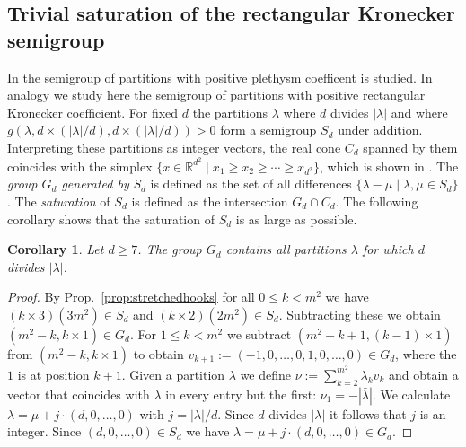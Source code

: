 \documentclass{article}
\numberwithin{equation}{section}
\newtheorem{corollary}[equation]{Corollary}
\theoremstyle{definition}
\def\la{\lambda}
\newcommand{\IR}{\mathbb R}
\begin{document}
\subsection{Trivial saturation of the rectangular Kronecker semigroup}
In \cite{BHI:15} the semigroup of partitions with positive plethysm coefficent is studied.
In analogy we study here the semigroup of partitions with positive rectangular Kronecker coefficient.
For fixed $d$ the partitions $\la$ where $d$ divides $|\la|$ and where $g(\la,d \times (|\la|/d), d \times (|\la|/d))>0$
form a semigroup $S_d$ under addition.
Interpreting these partitions as integer vectors, the real cone $C_d$ spanned by them
coincides with the simplex $\{x \in \IR^{d^2} \mid x_1 \geq x_2 \geq \cdots \geq x_{d^2}\}$,
which is shown in \cite{bci:09}.
The \emph{group $G_d$ generated by} $S_d$ is defined as the set of all differences $\{\la-\mu \mid \la,\mu\in S_d\}$.
The \emph{saturation} of $S_d$ is defined as the intersection $G_d \cap C_d$.
The following corollary shows that the saturation of $S_d$ is as large as possible.
\begin{corollary}\label{cor:kronsaturation}
Let $d \geq 7$. The group $G_d$ contains all partitions $\la$ for which $d$ divides $|\la|$.
\end{corollary}
\begin{proof}
By Prop.~\ref{prop:stretchedhooks} for all $0 \leq k < m^2$ we have $(k \times 3)(3m^2) \in S_d$ and $(k \times 2)(2m^2) \in S_d$.
Subtracting these we obtain $(m^2-k,k \times 1) \in G_d$.
For $1 \leq k < m^2$ we subtract $(m^2-k+1,(k-1) \times 1)$ from $(m^2-k,k \times 1)$ to obtain $v_{k+1}:=(-1,0,\ldots,0,1,0,\ldots,0) \in G_d$,
where the $1$ is at position $k+1$.
Given a partition $\la$ we define $\nu:=\sum_{k=2}^{m^2}\la_k v_k$ and obtain a vector that coincides with $\la$ in every entry but the first:
$\nu_1 = -|\bar\la|$.
We calculate $\la = \mu + j\cdot(d,0,\ldots,0)$ with $j=|\la|/d$.
Since $d$ divides $|\la|$ it follows that $j$ is an integer.
Since $(d,0,\ldots,0)\in S_d$ we have $\la = \mu+j\cdot(d,0,\ldots,0) \in G_d$.
\end{proof}
\end{document}
